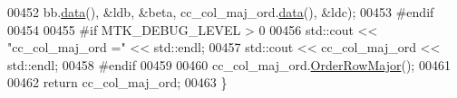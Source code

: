 \begin{DoxyCode}
00452          bb.\hyperlink{classmtk_1_1DenseMatrix_a0c33b8a9e01d157c61ddbdf807c25d84}{data}(), &ldb, &beta, cc\_col\_maj\_ord.\hyperlink{classmtk_1_1DenseMatrix_a0c33b8a9e01d157c61ddbdf807c25d84}{data}(), &ldc);
00453 \textcolor{preprocessor}{  #endif}
00454 
00455 \textcolor{preprocessor}{  #if MTK\_DEBUG\_LEVEL > 0}
00456   std::cout << \textcolor{stringliteral}{"cc\_col\_maj\_ord ="} << std::endl;
00457   std::cout << cc\_col\_maj\_ord << std::endl;
00458 \textcolor{preprocessor}{  #endif}
00459 
00460   cc\_col\_maj\_ord.\hyperlink{classmtk_1_1DenseMatrix_ac2949efba3e8278335d45418c85433e4}{OrderRowMajor}();
00461 
00462   \textcolor{keywordflow}{return} cc\_col\_maj\_ord;
00463 \}
\end{DoxyCode}
